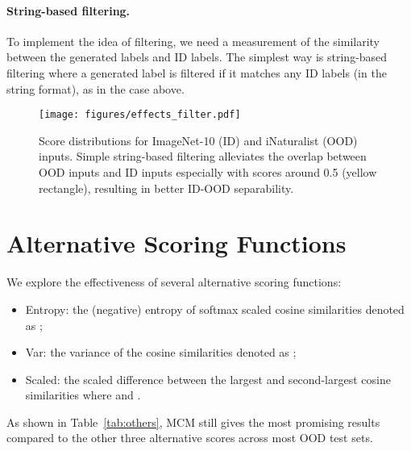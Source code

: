 \documentclass{article}
\begin{document}
\paragraph{String-based filtering.} To implement the idea of filtering, we need a measurement of the similarity between the generated labels and ID labels. The simplest way is string-based filtering where a generated label is filtered if it matches any ID labels (in the string format), as in the case above. 


\begin{figure*}[h]
\centering
\texttt{[image: figures/effects\_filter.pdf]}
\caption{Score distributions for ImageNet-10 (ID) and iNaturalist (OOD) inputs.  Simple string-based filtering alleviates the overlap between OOD inputs and ID inputs especially with scores around 0.5 (yellow rectangle), resulting in better ID-OOD separability.}
\label{fig:effects}
\end{figure*}









\section{Alternative Scoring Functions}
 
We explore the effectiveness of several alternative scoring functions:
\begin{itemize}
    \item Entropy: the (negative) entropy of softmax scaled cosine similarities denoted as ;
    \item Var: the variance of the cosine similarities denoted as ;
    \item Scaled: the scaled difference between the largest and second-largest cosine similarities  where  and .
\end{itemize}

As shown in Table~\ref{tab:others},  MCM still gives the most promising results compared to the other three alternative scores across most OOD test sets. 
\end{document}

